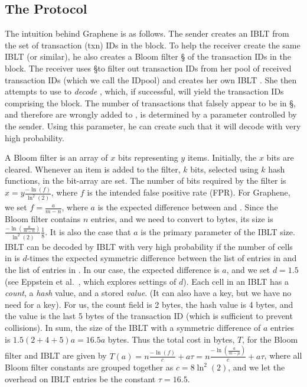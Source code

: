 

\subsection{The Protocol}
The intuition behind Graphene is as follows. The sender creates an IBLT \I
from the set of transaction (txn) IDs in the block. To help the receiver
create the same IBLT (or similar), he also creates a Bloom filter \S
of the transaction IDs in the block. The receiver uses \S to filter out
transaction IDs from her pool of received transaction IDs (which we call the IDpool) and creates her
own IBLT \Ip. She then attempts to use \Ip to \emph{decode} \I, which, if successful, will yield
the transaction IDs comprising the block. The number of transactions
that falsely appear to be in \S, and therefore are wrongly added to
\Ip, is determined by a parameter controlled by the sender. Using
this parameter, he can
create \I such that it will decode with very high probability.  %

A Bloom filter is an array of $x$ bits
representing $y$ items.  Initially, the $x$ bits are cleared. Whenever
an item is added to the filter, $k$ bits, selected using $k$ hash functions, in the bit-array are set. The number of bits
required by the filter is $x =y\frac{-\ln(f)}{\ln^2(2)}$, where $f$ is
the intended false positive rate (FPR).  For Graphene, we set $f=\frac{a}{m-n}$,
where $a$ is the expected difference between \I and \Ip .
Since the Bloom filter contains $n$ entries, and we need to convert to
bytes, its size is %
$\frac{-\ln(\frac{a}{m-n})}{\ln^2(2)}\frac18.$
%
It is also the case that $a$ is the primary parameter of the IBLT
size.  IBLT \I can be decoded by IBLT \Ip with very high probability
if the number of cells in \I is $d$-times the expected symmetric
difference between the list of entries in \I and the list of entries
in \Ip. In our case, the expected difference is $a$, and we set
$d=1.5$ (see Eppstein et al.~\cite{eppstein:2011}, which explores
settings of $d$). Each cell in an IBLT has a {\em count}, a {\em hash}
value, and a stored {\em value}.  (It can also have a key, but we have
no need for a key). For us, the count field is 2 bytes, the
hash value is 4 bytes, and the value is the last 5 bytes of the
transaction ID (which is sufficient to prevent collisions). In sum,
the size of the IBLT with a symmetric difference of $a$ entries is
$1.5(2+4+5)a=16.5a$ bytes.
%
Thus the total cost in bytes, $T$, for the Bloom filter and IBLT are
given by %
$T(a)= n\frac{-\ln(f)}{c}+ a\tau = n\frac{-\ln(\frac{a}{m-\mu})}{c}+ a\tau$, 
where all Bloom filter constants are grouped together as
$c=8\ln^2(2)$, and we let the overhead on IBLT entries be the constant
$\tau=16.5$.

